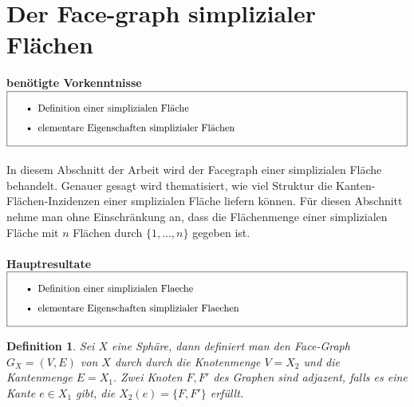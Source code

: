 \documentclass[12pt,titlepage,twoside,cleardoublepage]{article}
\theoremstyle{nummermitklammern}
\newtheorem{definition}[temp]{Definition}
\newtheorem{definition}[zahl]{Definition}
\numberwithin{equation}{section}
\begin{document}
\section{Der Face-graph simplizialer Flächen}
\textbf{benötigte Vorkenntnisse}\\
$\fbox{
\parbox{14cm}{\begin{itemize}
\item Definition einer simplizialen Fl\"ache 
\item elementare Eigenschaften simplizialer Fl\"achen
\end{itemize}
}}$\\\\
In diesem Abschnitt der Arbeit wird der Facegraph einer simplizialen Fläche behandelt. Genauer gesagt wird thematisiert, wie viel Struktur die Kanten-Flächen-Inzidenzen einer smplizialen Fläche liefern können.  
Für diesen Abschnitt nehme man ohne Einschränkung an, dass die Flächenmenge einer simplizialen Fläche mit $n$ Flächen  durch $\{1,\ldots,n\}$ gegeben ist.\\\\
\textbf{Hauptresultate}\\
$\fbox{
\parbox{14cm}{\begin{itemize}
\item Definition einer simplizialen Flaeche 
\item elementare Eigenschaften simplizialer Flaechen
\end{itemize}
}}$\\
\begin{definition}
Sei $X$ eine Sphäre, dann definiert man den Face-Graph $G_X=(V,E)$ von $X$ durch durch die Knotenmenge $V=X_2$ und die Kantenmenge $E=X_1.$ Zwei Knoten $F,F'$ des Graphen sind adjazent, falls es eine Kante $e\in X_1$ gibt, die $X_2(e)=\{F,F'\}$ erfüllt. 
\end{definition}
\end{document}
